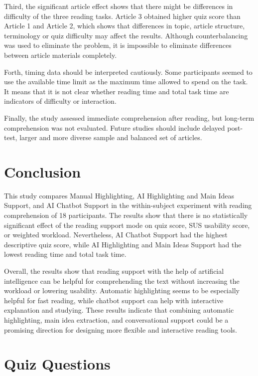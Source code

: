 \documentclass{IEEEtran}
\begin{document}
Third, the significant article effect shows that there might be differences in difficulty of the three reading tasks. Article 3 obtained higher quiz score than Article 1 and Article 2, which shows that differences in topic, article structure, terminology or quiz difficulty may affect the results. Although counterbalancing was used to eliminate the problem, it is impossible to eliminate differences between article materials completely.

Forth, timing data should be interpreted cautiously. Some participants seemed to use the available time limit as the maximum time allowed to spend on the task. It means that it is not clear whether reading time and total task time are indicators of difficulty or interaction.

Finally, the study assessed immediate comprehension after reading, but long-term comprehension was not evaluated. Future studies should include delayed post-test, larger and more diverse sample and balanced set of articles.



\section{Conclusion}

This study compares Manual Highlighting, AI Highlighting and Main Ideas Support, and AI Chatbot Support in the within-subject experiment with reading comprehension of 18 participants. The results show that there is no statistically significant effect of the reading support mode on quiz score, SUS usability score, or weighted workload. Nevertheless, AI Chatbot Support had the highest descriptive quiz score, while AI Highlighting and Main Ideas Support had the lowest reading time and total task time.

Overall, the results show that reading support with the help of artificial intelligence can be helpful for comprehending the text without increasing the workload or lowering usability. Automatic highlighting seems to be especially helpful for fast reading, while chatbot support can help with interactive explanation and studying. These results indicate that combining automatic highlighting, main idea extraction, and conversational support could be a promising direction for designing more flexible and interactive reading tools.


\appendices
\section{Quiz Questions}
\label{app:quiz_questions}
\end{document}

